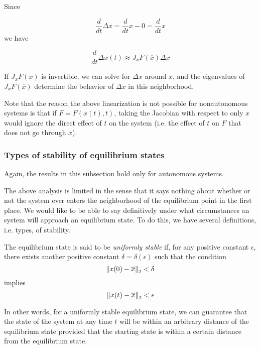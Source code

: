 Since

\begin{equation*}
  \frac{d}{dt}\Delta x = \frac{d}{dt} x - 0 = \frac{d}{dt} x
\end{equation*}
%
we have

\begin{equation*}
\frac{d}{dt}\Delta x(t) \approx J_x F(\overline{x}) \Delta x
\end{equation*}

If $J_x F(\overline{x})$ is invertible, we can solve for $\Delta x$ around $\overline{x}$, and the eigenvalues of $J_x F(\overline{x})$ determine the behavior of $\Delta x$ in this neighborhood.

Note that the reason the above linearization is not possible for nonautonomous systems is that if $F = F(x(t), t)$, taking the Jacobian with respect to only $x$ would ignore the direct effect of $t$ on the system (i.e. the effect of $t$ on $F$ that does not go through $x$).

\subsubsection{Types of stability of equilibrium states}

Again, the results in this subsection hold only for autonomous systems.

The above analysis is limited in the sense that it says nothing about whether or not the system ever enters the neighborhood of the equilibrium point in the first place. We would like to be able to say definitively under what circumstances an system will approach an equilibrium state. To do this, we have several definitions, i.e. types, of stability.

\begin{definition}
  The equilibrium state is said to be \emph{uniformly stable} if, for any positive constant $\epsilon$, there exists another positive constant $\delta = \delta(\epsilon)$ such that the condition
  \begin{equation*}
    \left\lVert x(0) - \overline{x} \right\rVert_2 < \delta
  \end{equation*}
  implies 
  \begin{equation*}
    \left\lVert x(t) - \overline{x} \right\rVert_2 < \epsilon
  \end{equation*}
  \cite[p. 681]{Haykin:2009:NNC:1213811}
\end{definition}

In other words, for a uniformly stable equilibrium state, we can guarantee that the state of the system at any time $t$ will be within an arbitrary distance of the equilibrium state provided that the starting state is within a certain distance from the equilibrium state.

